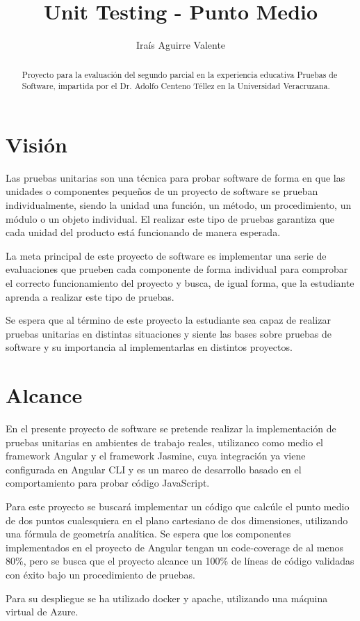 \documentclass{article}
\title{Unit Testing - Punto Medio}
\author{Iraís Aguirre Valente}
\begin{document}
\date{}

\maketitle

\begin{abstract}
   Proyecto para la evaluación del segundo parcial en la experiencia educativa Pruebas de Software, impartida por el Dr. Adolfo Centeno Téllez en la Universidad Veracruzana.
\end{abstract}
\date{}

\section{Visión}
Las pruebas unitarias son una técnica para probar software de forma en que las unidades o componentes pequeños de un proyecto de software se prueban individualmente, siendo la unidad una función, un método, un procedimiento, un módulo o un objeto individual. El realizar este tipo de pruebas garantiza que cada unidad del producto está funcionando de manera esperada.

La meta principal de este proyecto de software es implementar una serie de evaluaciones que prueben cada componente de forma individual para comprobar el correcto funcionamiento del proyecto y busca, de igual forma, que la estudiante aprenda a realizar este tipo de pruebas. 

Se espera que al término de este proyecto la estudiante sea capaz de realizar pruebas unitarias en distintas situaciones y siente las bases sobre pruebas de software y su importancia al implementarlas en distintos proyectos.

\section{Alcance}
En el presente proyecto de software se pretende realizar la implementación de pruebas unitarias en ambientes de trabajo reales, utilizanco como medio el framework Angular y el framework Jasmine, cuya integración ya viene configurada en Angular CLI y es un marco de desarrollo basado en el comportamiento para probar código JavaScript.

Para este proyecto se buscará implementar un código que calcúle el punto medio de dos puntos cualesquiera en el plano cartesiano de dos dimensiones, utilizando una fórmula de geometría analítica. Se espera que los componentes implementados en el proyecto de Angular tengan un code-coverage de al menos 80\%, pero se busca que el proyecto alcance un 100\% de líneas de código validadas con éxito bajo un procedimiento de pruebas. 

Para su despliegue se ha utilizado docker y apache, utilizando una máquina virtual de Azure.
\end{document}
